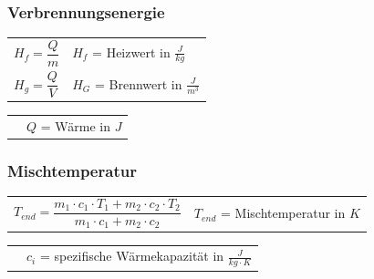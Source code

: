 		\newline
		\newline
		\newline
		\begin{minipage}[t]{18cm}
			\subsubsection{Verbrennungsenergie}
				\renewcommand{\arraystretch}{2.5}
				\begin{tabular}{ p{5cm} | p{7cm}}
					$H_f = \dfrac{Q}{m}$	&	$H_f$ = Heizwert in $\frac{J}{kg}$\\
					$H_g = \dfrac{Q}{V}$	&	$H_G$ = Brennwert in $\frac{J}{m^3}$\\
				\end{tabular}
				\renewcommand{\arraystretch}{1.5}
				\newline
				\begin{tabular}{ p{5cm} | p{7cm} }
					& $Q$ = Wärme in $J$\\
				\end{tabular} 
				\renewcommand{\arraystretch}{1}
		\end{minipage}
		\newline
		\newline
		\newline
		\begin{minipage}[t]{18cm}
			\subsubsection{Mischtemperatur}
			\renewcommand{\arraystretch}{2.5}
			\begin{tabular}{ p{5cm} | p{7cm}}
				$T_{end} = \dfrac{m_1 \cdot c_1 \cdot T_1 + m_2 \cdot c_2 \cdot T_2}{m_1 \cdot c_1 + m_2 \cdot c_2}$	&	$T_{end}$ = Mischtemperatur in $K$\\
			\end{tabular}
			\renewcommand{\arraystretch}{1.5}
			\newline
			\begin{tabular}{ p{5cm} | p{7cm} }
				&	$c_i$ = spezifische Wärmekapazität in $\frac{J}{kg \cdot K}$\\
			\end{tabular} 
			\renewcommand{\arraystretch}{1}
		\end{minipage}
	
	\newpage
